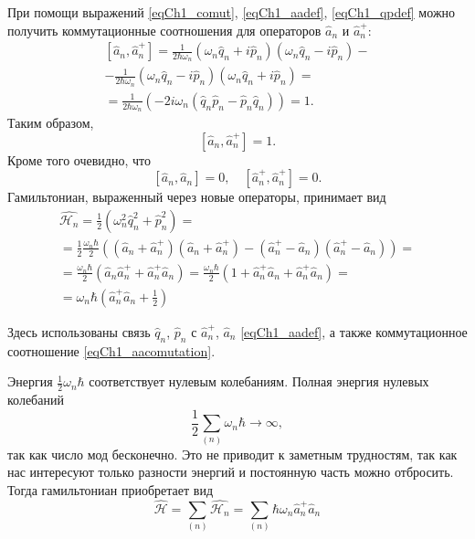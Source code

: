 При помощи выражений \eqref{eqCh1_comut}, 
\eqref{eqCh1_aadef}, \eqref{eqCh1_qpdef} можно получить коммутационные
соотношения для операторов $\hat{a}_n$ и $\hat{a}_n^{+}$: 
\begin{eqnarray}
\left[\hat{a}_n, \hat{a}_n^{+}\right] = 
\frac{1}{2 \hbar \omega_n}
\left( \omega_n \hat{q}_n + i \hat{p}_n\right) 
\left( \omega_n \hat{q}_n - i \hat{p}_n\right) - 
\nonumber \\
- \frac{1}{2 \hbar \omega_n}
\left( \omega_n \hat{q}_n - i \hat{p}_n\right) 
\left( \omega_n \hat{q}_n + i \hat{p}_n\right) =
\nonumber \\
= \frac{1}{2 \hbar \omega_n}
\left( - 2 i \omega_n 
\left(\hat{q}_n \hat{p}_n - \hat{p}_n \hat{q}_n\right)\right) = 1.
\end{eqnarray}
Таким образом,
\begin{equation}
\left[\hat{a}_n, \hat{a}_n^{+}\right] = 1.
\label{eqCh1_aacomutation}
\end{equation}
Кроме того очевидно, что
\begin{equation}
\left[\hat{a}_n, \hat{a}_n\right] = 0,
\quad
\left[\hat{a}_n^{+}, \hat{a}_n^{+}\right] = 0.
\end{equation}
Гамильтониан, выраженный через новые операторы, принимает вид
\begin{eqnarray}
\hat{\mathcal{H}_n} = 
\frac{1}{2}\left(\omega_n^2 \hat{q}_n^2 + \hat{p}_n^2\right) = 
\nonumber \\
= \frac{1}{2}\frac{\omega_n \hbar}{2}
\left(
\left(\hat{a}_n + \hat{a}_n^{+} \right)
\left(\hat{a}_n + \hat{a}_n^{+} \right)
-
\left(\hat{a}_n^{+} - \hat{a}_n \right)
\left(\hat{a}_n^{+} - \hat{a}_n \right)
\right) =
\nonumber \\
= \frac{\omega_n \hbar}{2} 
\left( \hat{a}_n \hat{a}_n^{+} + \hat{a}_n^{+} \hat{a}_n\right) =
\frac{\omega_n \hbar}{2} 
\left(1 + \hat{a}_n^{+} \hat{a}_n + \hat{a}_n^{+} \hat{a}_n\right) =
\nonumber \\
= \omega_n \hbar 
\left(\hat{a}_n^{+} \hat{a}_n + \frac{1}{2}\right)
\label{eqCh1_quant_stoyachie_volny}
\end{eqnarray}


Здесь использованы связь  $\hat{q}_n$, $\hat{p}_n$ 
с $\hat{a}_n^{+}$, $\hat{a}_n$ \eqref{eqCh1_aadef}, а также
коммутационное соотношение \eqref{eqCh1_aacomutation}. 

Энергия $\frac{1}{2}\omega_n \hbar$ соответствует нулевым
колебаниям. Полная энергия нулевых колебаний
\[
\frac{1}{2}\sum_{(n)}\omega_n \hbar \to \infty,
\] 
так как число мод бесконечно. Это не приводит к 
заметным трудностям, так как нас интересуют только разности
энергий и постоянную часть можно отбросить. Тогда гамильтониан
приобретает вид 
\begin{equation}
\hat{\mathcal{H}} = \sum_{(n)}\hat{\mathcal{H}_n} =
\sum_{(n)}\hbar \omega_n \hat{a}_n^{+}\hat{a}_n
\end{equation}

